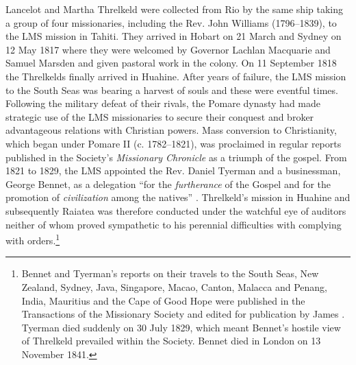 Lancelot and Martha Threlkeld were collected from Rio by the same ship taking a group of four missionaries, including the Rev. John Williams (1796--1839), to the LMS mission in Tahiti. They arrived in Hobart on 21 March and Sydney on 12 May 1817 where they were welcomed by Governor Lachlan Macquarie and Samuel Marsden and given pastoral work in the colony. On 11 September 1818 the Threlkelds finally arrived in Huahine. After years of failure, the LMS mission to the South Seas was bearing a harvest of souls and these were eventful times. Following the military defeat of their rivals, the Pomare dynasty had made strategic use of the LMS missionaries to secure their conquest and broker advantageous relations with Christian powers. Mass conversion to Christianity, which began under Pomare II (c. 1782--1821), was proclaimed in regular reports published in the Society’s \textit{Missionary Chronicle} as a triumph of the gospel. From 1821 to 1829, the LMS appointed the Rev. Daniel Tyerman and a businessman, George Bennet, as a delegation “for the \textit{furtherance} of the Gospel and for the promotion of \textit{civilization} among the natives” \citep[207]{sibree_register_1923}. Threlkeld’s mission in Huahine and subsequently Raiatea was therefore conducted under the watchful eye of auditors neither of whom proved sympathetic to his perennial difficulties with complying with orders.\footnote{Bennet and Tyerman’s reports on their travels to the South Seas, New Zealand, Sydney, Java, Singapore, Macao, Canton, Malacca and Penang, India, Mauritius and the Cape of Good Hope were published in the Transactions of the Missionary Society and edited for publication by James \citet{montgomery_journal_1831}. Tyerman died suddenly on 30 July 1829, which meant Bennet’s hostile view of Threlkeld prevailed within the Society. Bennet died in London on 13 November 1841.}

